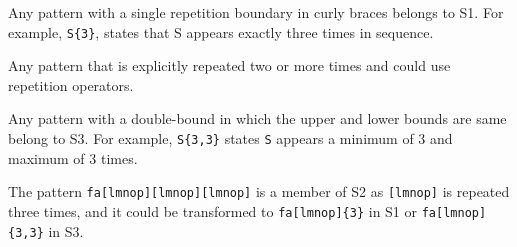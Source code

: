 \begin{description} \itemsep -1pt
\item[S1:] Any pattern with a single repetition boundary in curly braces belongs to S1. For example, \verb!S{3}!, states that S appears exactly three times in sequence.
\item[S2:] Any pattern that is explicitly repeated two or more times and could use repetition operators.
\item[S3:] Any pattern with a double-bound in which the upper and lower bounds are same belong to S3. For example, \verb!S{3,3}! states \verb!S! appears a minimum of 3 and maximum of 3 times.
\end{description}

The pattern \verb!fa[lmnop][lmnop][lmnop]! is a member of S2 as \verb![lmnop]! is repeated three times, and it could be transformed to \verb!fa[lmnop]{3}! in S1 or \verb!fa[lmnop]{3,3}! in S3.


